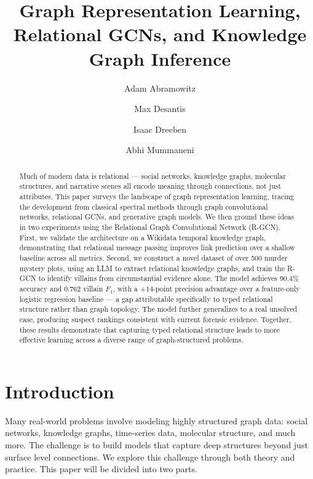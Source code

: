 \documentclass[11pt]{article}
\title{\textbf{Graph Representation Learning,
       Relational GCNs, and Knowledge Graph Inference}}
\author{
  Adam Abramowitz \and
  Max Desantis \and
  Isaac Dreeben \and
  Abhi Mummaneni
}
\date{}   %
\theoremstyle{definition}
\begin{document}
\maketitle
\thispagestyle{empty}

\begin{abstract}

Much of modern data is relational — social networks, knowledge graphs, molecular structures, and narrative scenes all encode meaning through connections, not just attributes. This paper surveys the landscape of graph representation learning, tracing the development from classical spectral methods through graph convolutional networks, relational GCNs, and generative graph models. We then ground these ideas in two experiments using the Relational Graph Convolutional Network (R-GCN). First, we validate the architecture on a Wikidata temporal knowledge graph, demonstrating that relational message passing improves link prediction over a shallow baseline across all metrics. Second, we construct a novel dataset of over 500 murder mystery plots, using an LLM to extract relational knowledge graphs, and train the R-GCN to identify villains from circumstantial evidence alone. The model achieves 90.4\% accuracy and 0.762 villain $F_1$, with a $+14$-point precision advantage over a feature-only logistic regression baseline — a gap attributable specifically to typed relational structure rather than graph topology. The model further generalizes to a real unsolved case, producing suspect rankings consistent with current forensic evidence. Together, these results demonstrate that capturing typed relational structure leads to more effective learning across a diverse range of graph-structured problems.

\end{abstract}

\newpage
\tableofcontents
\newpage

\section{Introduction}
\label{sec:intro}

Many real-world problems involve modeling highly structured graph data: social networks, knowledge graphs, time-series data, molecular structure, and much more. The challenge is to build models that capture deep structures beyond just surface level connections. We explore this challenge through both theory and practice. This paper will be divided into two parts. 
\end{document}
